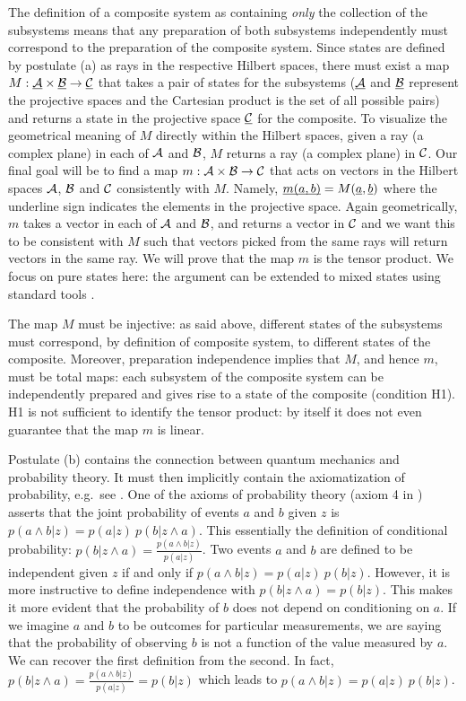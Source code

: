 \documentclass[aps,prl,amsmath,amssymb,twocolumn,nofootinbib]{revtex4}
\theoremstyle{plain}
\theoremstyle{definition}
\theoremstyle{remark}
\newcommand{\pj}[1] {\underbar{$#1$}}
\begin{document}
	The definition of a composite system as containing {\em only} the
	collection of the subsystems means that any preparation of both
	subsystems independently must correspond to the preparation of the
	composite system. Since states are defined by postulate (a) as rays in
	the respective Hilbert spaces, there must exist a map $M : \pj{\cal A}
	\times \pj{\cal B } \to \pj{\cal C}$ that takes a pair of states for
	the subsystems ($\pj{\cal A}$ and $\pj{\cal B }$ represent the
	projective spaces and the Cartesian product is the set of all possible
	pairs) and returns a state in the projective space $\pj{\cal C}$ for
	the composite. To visualize the geometrical meaning of $M$ directly within the Hilbert spaces, given a ray (a complex plane) in each of $\cal A$ and $\cal B$, $M$ returns a ray (a complex plane) in $\cal C$.  Our final goal will be to find a map
	$m:{\cal A}\times{\cal B}\to{\cal C}$ that acts on vectors in the
	Hilbert spaces $\cal A$, $\cal B$ and $\cal C$ consistently with $M$. Namely,
	$\pj{m(a,b)}=M(\pj{a},\pj{b})$ where the underline sign indicates the
	elements in the projective space. Again geometrically, $m$ takes a vector in each of $\cal A$ and $\cal B$, and returns a vector in $\cal C$ and we want this to be consistent with $M$ such that vectors picked from the same rays will return vectors in the same ray. We will prove that the map $m$ is
	the tensor product. We focus on pure states here: the argument can be
	extended to mixed states using standard tools \cite{nielsenchuang}.
	
	The map $M$ must be injective: as said above, different states of the
	subsystems must correspond, by definition of composite system, to
	different states of the composite. Moreover, preparation independence
	implies that $M$, and hence $m$, must be total maps: each subsystem of
	the composite system can be independently prepared and gives rise to a
	state of the composite (condition H1).  H1 is not sufficient
	to identify the tensor product: by itself it does not even guarantee
	that the map $m$ is linear.
	
	Postulate (b) contains the connection between quantum mechanics
	and probability theory. It must then implicitly contain the
	axiomatization of probability, e.g.~see
	\cite{ballentinepaper,ballentinebook,cox}. One of the axioms of
	probability theory (axiom 4 in \cite{ballentinepaper}) asserts that
	the joint probability of events $a$ and $b$ given $z$ is
	$p(a\wedge b|z)=p(a|z)\:p(b|z\wedge a)$. This essentially the definition of conditional probability: $p(b|z\wedge a) = \frac{p(a\wedge b|z)}{p(a|z)}$. Two events $a$ and $b$ are defined to be 
	independent given $z$ if and only if $p(a\wedge b|z)=p(a|z)\:p(b|z)$. However, it is more instructive to define independence with $p(b|z\wedge a)=p(b|z)$. This makes it more evident that the probability of $b$ does not depend on conditioning on $a$. If we imagine $a$ and $b$ to be outcomes for particular measurements, we are saying that the probability of observing $b$ is not a function of the value measured by $a$. We can recover the first definition from the second. In fact, $p(b|z\wedge a)=\frac{p(a\wedge b|z)}{p(a|z)} =p(b|z)$ which leads to $p(a\wedge b|z)=p(a|z)\:p(b|z)$.
	
\end{document}
